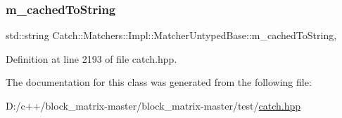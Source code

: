 \subsubsection{\texorpdfstring{m\+\_\+cached\+To\+String}{m\_cachedToString}}
{\footnotesize\ttfamily std\+::string Catch\+::\+Matchers\+::\+Impl\+::\+Matcher\+Untyped\+Base\+::m\+\_\+cached\+To\+String\hspace{0.3cm}{\ttfamily [mutable]}, {\ttfamily [protected]}}



Definition at line 2193 of file catch.\+hpp.



The documentation for this class was generated from the following file\+:\begin{DoxyCompactItemize}
\item 
D\+:/c++/block\+\_\+matrix-\/master/block\+\_\+matrix-\/master/test/\mbox{\hyperlink{catch_8hpp}{catch.\+hpp}}\end{DoxyCompactItemize}
